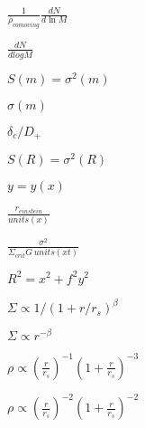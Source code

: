 \documentclass{article}
\begin{document}
$ \frac{1}{\overline{\rho}_{comoving}}\frac{dN}{d\ln M} $
\pagebreak

$ \frac{dN}{dlogM} $
\pagebreak

$ S(m)=\sigma^2(m) $
\pagebreak

$ \sigma(m) $
\pagebreak

$ \delta_c/D_+ $
\pagebreak

$ S(R)=\sigma^2(R) $
\pagebreak

$ y=y(x) $
\pagebreak

$ \frac{r_{einstein}}{units(x)} $
\pagebreak

$ \frac{\sigma^2}{\Sigma_{crit}G\, units(xt) } $
\pagebreak

$ R^2 = x^2 + f^2 y^2 $
\pagebreak

$ \Sigma \propto 1/(1 + r/r_s )^\beta $
\pagebreak

$ \Sigma \propto r^{-\beta} $
\pagebreak

$ \rho \propto \left( \frac{r}{r_s} \right)^{-1} \left( 1 + \frac{r}{r_s} \right)^{-3} $
\pagebreak

$ \rho \propto \left( \frac{r}{r_s} \right)^{-2} \left( 1 + \frac{r}{r_s} \right)^{-2} $
\pagebreak
\end{document}
